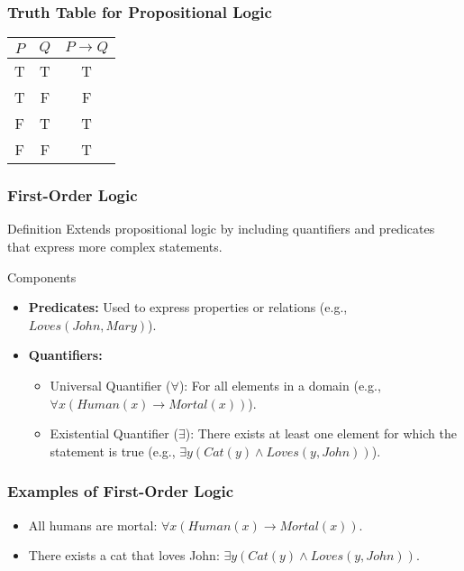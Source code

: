 \documentclass[aspectratio=169]{beamer}
\begin{document}
\begin{frame}[fragile]
    \frametitle{Truth Table for Propositional Logic}
    \begin{center}
        \begin{tabular}{|c|c|c|}
            \hline
            $P$ & $Q$ & $P \rightarrow Q$ \\
            \hline
            T & T & T \\
            T & F & F \\
            F & T & T \\
            F & F & T \\
            \hline
        \end{tabular}
    \end{center}
\end{frame}

\begin{frame}[fragile]
    \frametitle{First-Order Logic}
    \begin{block}{Definition}
        Extends propositional logic by including quantifiers and predicates that express more complex statements.
    \end{block}
    
    \begin{block}{Components}
        \begin{itemize}
            \item \textbf{Predicates:} Used to express properties or relations (e.g., $Loves(John, Mary)$).
            \item \textbf{Quantifiers:}
                \begin{itemize}
                    \item Universal Quantifier ($\forall$): For all elements in a domain (e.g., $\forall x (Human(x) \rightarrow Mortal(x))$).
                    \item Existential Quantifier ($\exists$): There exists at least one element for which the statement is true (e.g., $\exists y (Cat(y) \land Loves(y, John))$).
                \end{itemize}
        \end{itemize}
    \end{block}
\end{frame}

\begin{frame}[fragile]
    \frametitle{Examples of First-Order Logic}
    \begin{itemize}
        \item All humans are mortal: $\forall x (Human(x) \rightarrow Mortal(x))$.
        \item There exists a cat that loves John: $\exists y (Cat(y) \land Loves(y, John))$.
    \end{itemize}
\end{frame}
\end{document}
